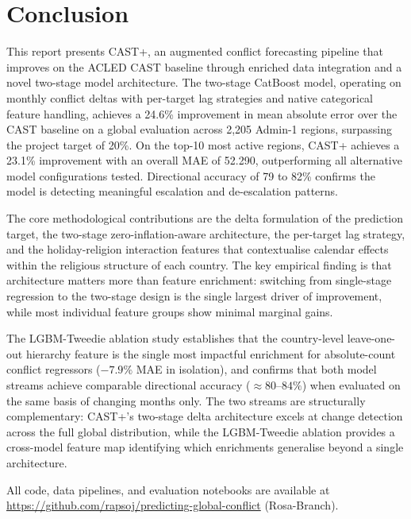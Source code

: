 \documentclass[12pt,a4paper]{article}
\begin{document}
\section{Conclusion}

This report presents CAST+, an augmented conflict forecasting pipeline
that improves on the ACLED CAST baseline through enriched data
integration and a novel two-stage model architecture. The two-stage
CatBoost model, operating on monthly conflict deltas with per-target
lag strategies and native categorical feature handling, achieves a
24.6\% improvement in mean absolute error over the CAST baseline on a
global evaluation across 2,205 Admin-1 regions, surpassing the project
target of 20\%. On the top-10 most active regions, CAST+ achieves a
23.1\% improvement with an overall MAE of 52.290, outperforming all
alternative model configurations tested. Directional accuracy of 79 to
82\% confirms the model is detecting meaningful escalation and
de-escalation patterns.

The core methodological contributions are the delta formulation of the
prediction target, the two-stage zero-inflation-aware architecture, the
per-target lag strategy, and the holiday-religion interaction features
that contextualise calendar effects within the religious structure of
each country. The key empirical finding is that architecture matters
more than feature enrichment: switching from single-stage regression
to the two-stage design is the single largest driver of improvement,
while most individual feature groups show minimal marginal gains.

The LGBM-Tweedie ablation study establishes that the country-level
leave-one-out hierarchy feature is the single most impactful
enrichment for absolute-count conflict regressors ($-7.9\%$ MAE in
isolation), and confirms that both model streams achieve comparable
directional accuracy ($\approx 80$--$84\%$) when evaluated on the
same basis of changing months only. The two streams are structurally
complementary: CAST+'s two-stage delta architecture excels at change
detection across the full global distribution, while the LGBM-Tweedie
ablation provides a cross-model feature map identifying which
enrichments generalise beyond a single architecture.

All code, data pipelines, and evaluation notebooks are available at
\url{https://github.com/rapsoj/predicting-global-conflict} (Rosa-Branch).


\appendix
\end{document}
